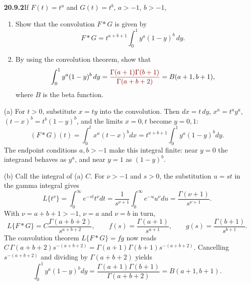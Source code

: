 \par\bigskip
\noindent\textbf{20.9.2}\quad If $F(t)=t^{a}$ and $G(t)=t^{b}$,
$a>-1$, $b>-1$,
\begin{enumerate}
\item[(a)] Show that the convolution $F*G$ is given by
\[
F*G=t^{a+b+1}\int_{0}^{1}y^{a}(1-y)^{b}\,dy.
\]
\item[(b)] By using the convolution theorem, show that
\[
\int_{0}^{1}y^{a}(1-y)^{b}\,dy
=\erratum{\frac{\Gamma(a+1)\Gamma(b+1)}{\Gamma(a+b+2)}}=B(a+1,b+1),
\]
where $B$ is the beta function.
\end{enumerate}
\solution
(a) For $t>0$, substitute $x=ty$ into the convolution. Then
$dx=t\,dy$, $x^a=t^ay^a$, $(t-x)^b=t^b(1-y)^b$, and the limits
$x=0,t$ become $y=0,1$:
\[
(F*G)(t)=\int_0^t x^a(t-x)^b dx
=t^{a+b+1}\int_0^1 y^a(1-y)^bdy.
\]
The endpoint conditions $a,b>-1$ make this integral finite:
near $y=0$ the integrand behaves as $y^a$, and near $y=1$ as
$(1-y)^b$.

(b) Call the integral of (a) $C$. For $\nu>-1$ and $s>0$, the
substitution $u=st$ in the gamma integral gives
\[
L\{t^\nu\}=\int_0^\infty e^{-st}t^\nu dt
=\frac1{s^{\nu+1}}\int_0^\infty e^{-u}u^\nu du
=\frac{\Gamma(\nu+1)}{s^{\nu+1}}.
\]
With $\nu=a+b+1>-1$, $\nu=a$ and $\nu=b$ in turn,
\[
L\{F*G\}=C\frac{\Gamma(a+b+2)}{s^{a+b+2}},\qquad
f(s)=\frac{\Gamma(a+1)}{s^{a+1}},\qquad
g(s)=\frac{\Gamma(b+1)}{s^{b+1}}.
\]
The convolution theorem $L\{F*G\}=fg$ now reads
$C\,\Gamma(a+b+2)s^{-(a+b+2)}=\Gamma(a+1)\Gamma(b+1)s^{-(a+b+2)}$.
Cancelling $s^{-(a+b+2)}$ and dividing by $\Gamma(a+b+2)$ yields
\[
\boxed{\int_0^1y^a(1-y)^bdy
=\frac{\Gamma(a+1)\Gamma(b+1)}{\Gamma(a+b+2)}
=B(a+1,b+1)}.
\]

